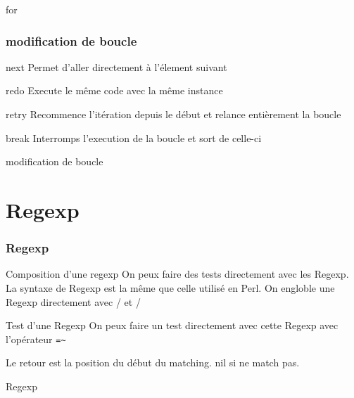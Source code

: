 \documentclass{beamer}
\begin{document}
\begin{frame}
  \begin{block}{for}
    
  \end{block}
\end{frame}

\begin{frame}
  \frametitle{modification de boucle}
  \begin{block}{next}
    Permet d'aller directement à l'\'element suivant
  \end{block}
  \begin{block}{redo}
    Execute le même code avec la même instance
  \end{block}
  \begin{block}{retry}
    Recommence l'it\'eration depuis le d\'ebut et relance entièrement la boucle
  \end{block}
  \begin{block}{break}
    Interromps l'execution de la boucle et sort de celle-ci
  \end{block}
\end{frame}

\begin{frame}
  \begin{block}{modification de boucle}
    
  \end{block}
\end{frame}

\section{Regexp}

\begin{frame}
  \frametitle{Regexp}
  \begin{block}{Composition d'une regexp}
    On peux faire des tests directement avec les Regexp. La syntaxe de Regexp est la même que celle
    utilis\'e en Perl. On engloble une Regexp directement avec / et /
  \end{block}
  \begin{block}{Test d'une Regexp}
    On peux faire un test directement avec cette Regexp avec l'op\'erateur \verb?=~?

    Le retour est la position du d\'ebut du matching. nil si ne match pas.
  \end{block}
\end{frame}

\begin{frame}
  \begin{block}{Regexp}
    
  \end{block}
\end{frame}
\end{document}
